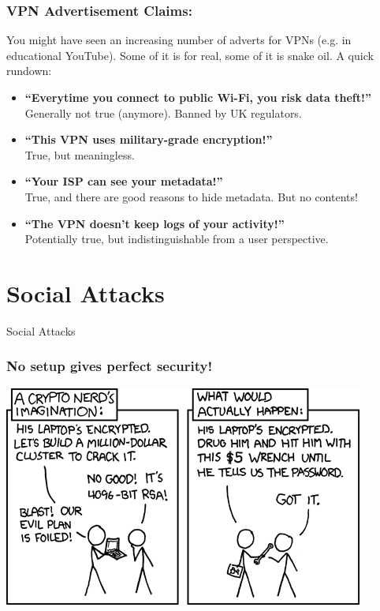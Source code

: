 \documentclass[aspectratio=169,dvipsnames]{beamer}
\begin{document}
\begin{frame}
\frametitle{VPN Advertisement Claims:}

You might have seen an increasing number of adverts for VPNs (e.g. in educational YouTube). Some of it is for real, some of it is snake oil. A quick rundown:
\bigskip

\begin{itemize}
\pause\item \textbf{``Everytime you connect to public Wi-Fi, you risk data theft!''}\\
Generally not true (anymore). Banned by UK regulators.

\pause \item \textbf{``This VPN uses military-grade encryption!''}\\
True, but meaningless.

\pause \item \textbf{``Your ISP can see your metadata!''}\\True, and there are good reasons to hide metadata. But no contents!

\pause \item \textbf{``The VPN doesn't keep logs of your activity!''}\\Potentially true, but indistinguishable from a user perspective.
\end{itemize}
\end{frame}


\section{Social Attacks}
\begin{frame}
\begin{center}
\huge Social Attacks
\end{center}
\end{frame}

\begin{frame}
\frametitle{No setup gives perfect security!}
\begin{center}
\includegraphics[height=0.65\textheight,keepaspectratio]{images/security.png} 
\end{center}
\end{frame}
\end{document}
